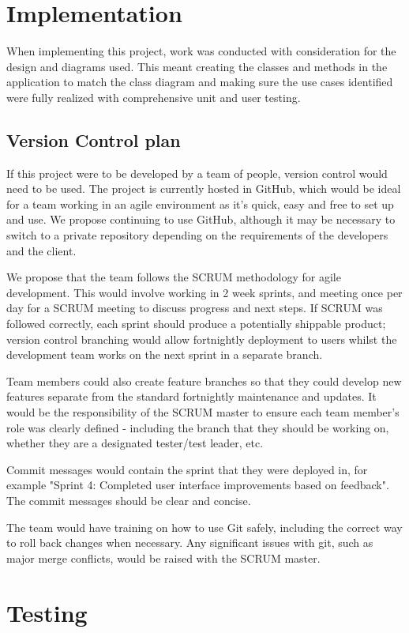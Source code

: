 \documentclass[a4paper]{article}
\begin{document}
\section{Implementation}
\label{sec:implementation}
When implementing this project, work was conducted with consideration for the design and diagrams used. This meant creating the classes and methods in the application to match the class diagram and making sure the use cases identified were fully realized with comprehensive unit and user testing.

\subsection{Version Control plan}
If this project were to be developed by a team of people, version control would need to be used. The project is currently hosted in GitHub, which would be ideal for a team working in an agile environment as it's quick, easy and free to set up and use. We propose continuing to use GitHub, although it may be necessary to switch to a private repository depending on the requirements of the developers and the client.

We propose that the team follows the SCRUM methodology for agile development. This would involve working in 2 week sprints, and meeting once per day for a SCRUM meeting to discuss progress and next steps. If SCRUM was followed correctly, each sprint should produce a potentially shippable product; version control branching would allow fortnightly deployment to users whilst the development team works on the next sprint in a separate branch.

Team members could also create feature branches so that they could develop new features separate from the standard fortnightly maintenance and updates. It would be the responsibility of the SCRUM master to ensure each team member's role was clearly defined - including the branch that they should be working on, whether they are a designated tester/test leader, etc.

Commit messages would contain the sprint that they were deployed in, for example "Sprint 4: Completed user interface improvements based on feedback". The commit messages should be clear and concise.

The team would have training on how to use Git safely, including the correct way to roll back changes when necessary. Any significant issues with git, such as major merge conflicts, would be raised with the SCRUM master.

\section{Testing}
\label{sec:testing}
\end{document}

